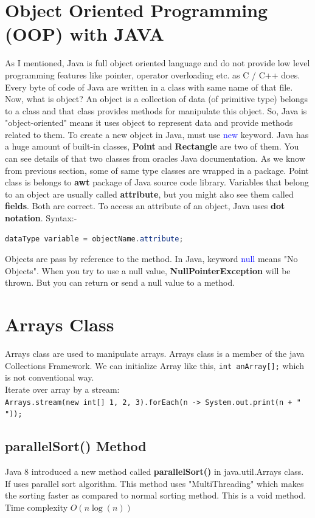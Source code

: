 \documentclass[10 pt]{book}
\begin{document}
\section{Object Oriented Programming (OOP) with \textbf{JAVA}}
As I mentioned, Java is full object oriented language and do not provide low level programming features like pointer, operator overloading etc. as C / C++ does. Every byte of code of Java are written in a class with same name of that file. Now, what is object? An object is a collection of data (of primitive type) belongs to a class and that class provides methods for manipulate this object. So, Java is "object-oriented" means it uses object to represent data and provide methods related to them. To create a new object in Java, must use \textcolor{blue}{new} keyword. Java has a huge amount of built-in classes, \textbf{Point} and \textbf{Rectangle} are two of them. You can see details of that two classes from oracles Java documentation. As we know from previous section, some of same type classes are wrapped in a package. Point class is belongs to \textbf{awt} package of Java source code library. Variables that belong to an object are usually called \textbf{attribute}, but you might also see them called \textbf{fields}. Both are correct. To access an attribute of an object, Java uses \textbf{dot notation}. Syntax:-\hfill
\begin{lstlisting}[language = java]
	dataType variable = objectName.attribute;
\end{lstlisting}
Objects are pass by reference to the method. In Java, keyword \textcolor{blue}{null} means "No Objects". When you try to use a null value, \textbf{NullPointerException} will be thrown. But you can return or send a null value to a method.

\section{Arrays Class}
Arrays class are used to manipulate arrays. Arrays class is a member of the java Collections Framework. We can initialize Array like this, \texttt{int anArray[];} which is not conventional way.\\
Iterate over array by a stream:\\
\texttt{\footnotesize Arrays.stream(new int[] {1, 2, 3}).forEach(n -> System.out.print(n + " "));}
\subsection{parallelSort() Method}
Java 8 introduced a new method called \textbf{parallelSort()} in java.util.Arrays class. If uses parallel sort algorithm. This method uses "MultiThreading" which makes the sorting faster as compared to normal sorting method. This is a void method. Time complexity $O(n\log(n))$
\end{document}
